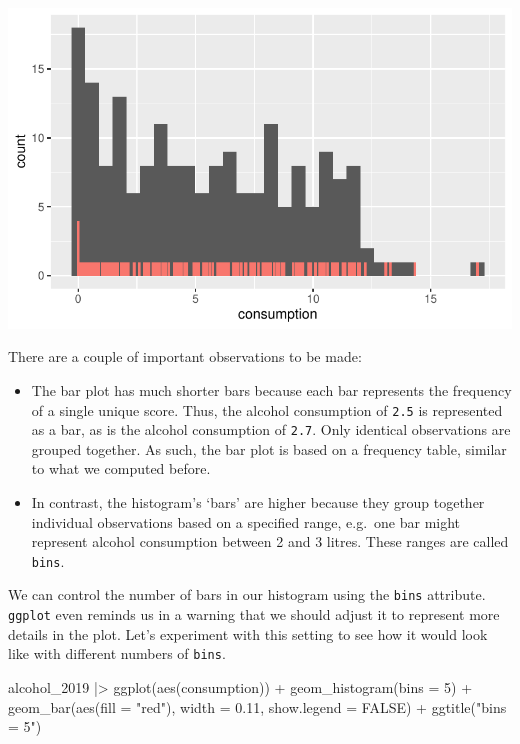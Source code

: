 \documentclass[
  letterpaper,
]{krantz}
\makeatletter
\newenvironment{Shaded}{\begin{snugshade}}{\end{snugshade}}
\newcommand{\AttributeTok}[1]{\textcolor[rgb]{0.40,0.45,0.13}{#1}}
\newcommand{\ConstantTok}[1]{\textcolor[rgb]{0.56,0.35,0.01}{#1}}
\newcommand{\DecValTok}[1]{\textcolor[rgb]{0.68,0.00,0.00}{#1}}
\newcommand{\FloatTok}[1]{\textcolor[rgb]{0.68,0.00,0.00}{#1}}
\newcommand{\FunctionTok}[1]{\textcolor[rgb]{0.28,0.35,0.67}{#1}}
\newcommand{\NormalTok}[1]{\textcolor[rgb]{0.00,0.23,0.31}{#1}}
\newcommand{\SpecialCharTok}[1]{\textcolor[rgb]{0.37,0.37,0.37}{#1}}
\newcommand{\StringTok}[1]{\textcolor[rgb]{0.13,0.47,0.30}{#1}}
\newenvironment{kframe}{%
\medskip{}
\setlength{\fboxsep}{.8em}
 \def\at@end@of@kframe{}%
 \ifinner\ifhmode%
  \def\at@end@of@kframe{\end{minipage}}%
  \begin{minipage}{\columnwidth}%
 \fi\fi%
 \def\FrameCommand##1{\hskip\@totalleftmargin \hskip-\fboxsep
 \colorbox{shadecolor}{##1}\hskip-\fboxsep
     \hskip-\linewidth \hskip-\@totalleftmargin \hskip\columnwidth}%
 \MakeFramed {\advance\hsize-\width
   \@totalleftmargin\z@ \linewidth\hsize
   \@setminipage}}%
 {\par\unskip\endMakeFramed%
 \at@end@of@kframe}
\renewenvironment{Shaded}{\begin{kframe}}{\end{kframe}}
\makeatother
\begin{document}
\includegraphics{08_descriptive_statistics_files/figure-latex/histogram-vs-barplot-1.pdf}

There are a couple of important observations to be made:

\begin{itemize}
\item
  The bar plot has much shorter bars because each bar represents the
  frequency of a single unique score. Thus, the alcohol consumption of
  \texttt{2.5} is represented as a bar, as is the alcohol consumption of
  \texttt{2.7}. Only identical observations are grouped together. As
  such, the bar plot is based on a frequency table, similar to what we
  computed before.
\item
  In contrast, the histogram's `bars' are higher because they group
  together individual observations based on a specified range, e.g.~one
  bar might represent alcohol consumption between 2 and 3 litres. These
  ranges are called \texttt{bins}.
\end{itemize}

We can control the number of bars in our histogram using the
\texttt{bins} attribute. \texttt{ggplot} even reminds us in a warning
that we should adjust it to represent more details in the plot. Let's
experiment with this setting to see how it would look like with
different numbers of \texttt{bins}.

\begin{Shaded}
\begin{Highlighting}[]
\NormalTok{  alcohol\_2019 }\SpecialCharTok{|\textgreater{}}
  \FunctionTok{ggplot}\NormalTok{(}\FunctionTok{aes}\NormalTok{(consumption)) }\SpecialCharTok{+}
  \FunctionTok{geom\_histogram}\NormalTok{(}\AttributeTok{bins =} \DecValTok{5}\NormalTok{) }\SpecialCharTok{+}
  \FunctionTok{geom\_bar}\NormalTok{(}\FunctionTok{aes}\NormalTok{(}\AttributeTok{fill =} \StringTok{"red"}\NormalTok{), }\AttributeTok{width =} \FloatTok{0.11}\NormalTok{, }\AttributeTok{show.legend =} \ConstantTok{FALSE}\NormalTok{) }\SpecialCharTok{+}
  \FunctionTok{ggtitle}\NormalTok{(}\StringTok{"bins = 5"}\NormalTok{)}
\end{Highlighting}
\end{Shaded}
\end{document}
